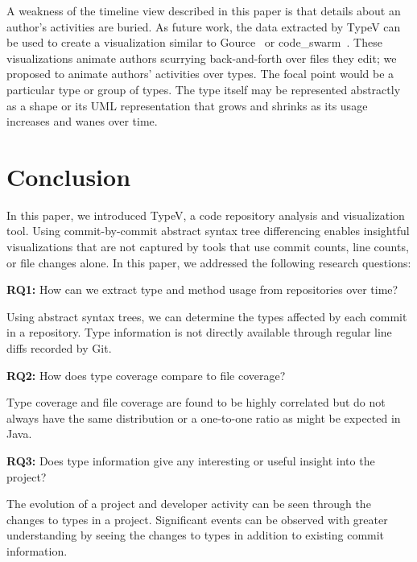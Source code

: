 A weakness of the timeline view described in this paper is that details about an author's activities are buried. As future work, the data extracted by TypeV can be used to create a visualization similar to Gource~\cite{gource} or code\_swarm~\cite{codeswarm}. These visualizations animate authors scurrying back-and-forth over files they edit; we proposed to animate authors' activities over types. The focal point would be a particular type or group of types. The type itself may be represented abstractly as a shape or its UML representation that grows and shrinks as its usage increases and wanes over time.

\section{Conclusion}

In this paper, we introduced TypeV, a code repository analysis and visualization tool. Using commit-by-commit abstract syntax tree differencing enables insightful visualizations that are not captured by tools that use commit counts, line counts, or file changes alone. In this paper, we addressed the following research questions:

\textbf{RQ1:} How can we extract type and method usage from repositories over time?

\begin{framed}
\noindent
Using abstract syntax trees, we can determine the types affected by each commit in a repository. Type information is not directly available through regular line diffs recorded by Git.
\end{framed}

\textbf{RQ2:} How does type coverage compare to file coverage?

\begin{framed}
\noindent
Type coverage and file coverage are found to be highly correlated but do not always have the same distribution or a one-to-one ratio as might be expected in Java.
\end{framed}

\textbf{RQ3:} Does type information give any interesting or useful insight into the project?

\begin{framed}
\noindent
The evolution of a project and developer activity can be seen through the changes to types in a project. Significant events can be observed with greater understanding by seeing the changes to types in addition to existing commit information.
\end{framed}

